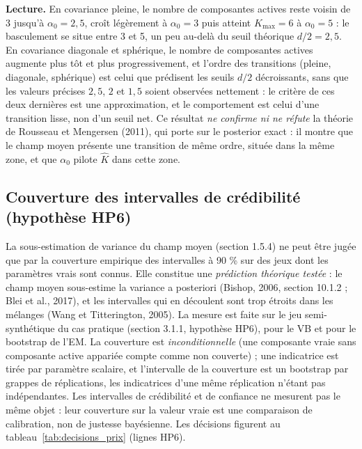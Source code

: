 
\textbf{Lecture. }En covariance pleine, le nombre de composantes actives reste voisin de 3 jusqu'à $\alpha_0 = 2{,}5$, croît légèrement à $\alpha_0 = 3$ puis atteint $K_{\max}=6$ à $\alpha_0 = 5$ : le basculement se situe entre 3 et 5, un peu au-delà du seuil théorique $d/2 = 2{,}5$. En covariance diagonale et sphérique, le nombre de composantes actives augmente plus tôt et plus progressivement, et l'ordre des transitions (pleine, diagonale, sphérique) est celui que prédisent les seuils $d/2$ décroissants, sans que les valeurs précises $2{,}5$, $2$ et $1{,}5$ soient observées nettement : le critère de ces deux dernières est une approximation, et le comportement est celui d'une transition lisse, non d'un seuil net. Ce résultat \emph{ne confirme ni ne réfute} la théorie de Rousseau et Mengersen (2011), qui porte sur le posterior exact : il montre que le champ moyen présente une transition de même ordre, située dans la même zone, et que $\alpha_0$ pilote $\hat K$ dans cette zone.

\subsection{Couverture des intervalles de crédibilité (hypothèse HP6)}
La sous-estimation de variance du champ moyen (section 1.5.4) ne peut être jugée que par la couverture empirique des intervalles à 90 \% sur des jeux dont les paramètres vrais sont connus. Elle constitue une \emph{prédiction théorique testée} : le champ moyen sous-estime la variance a posteriori (Bishop, 2006, section 10.1.2 ; Blei et al., 2017), et les intervalles qui en découlent sont trop étroits dans les mélanges (Wang et Titterington, 2005). La mesure est faite sur le jeu semi-synthétique du cas pratique (section 3.1.1, hypothèse HP6), pour le VB et pour le bootstrap de l'EM. La couverture est \emph{inconditionnelle} (une composante vraie sans composante active appariée compte comme non couverte) ; une indicatrice est tirée par paramètre scalaire, et l'intervalle de la couverture est un bootstrap par grappes de réplications, les indicatrices d'une même réplication n'étant pas indépendantes. Les intervalles de crédibilité et de confiance ne mesurent pas le même objet : leur couverture sur la valeur vraie est une comparaison de calibration, non de justesse bayésienne. Les décisions figurent au tableau~\ref{tab:decisions_prix} (lignes HP6).

